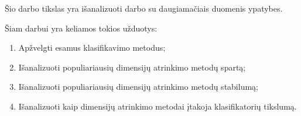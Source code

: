 Šio darbo tikslas yra išanalizuoti darbo su daugiamačiais duomenis ypatybes.

Šiam darbui yra keliamos tokios užduotys:
\begin{enumerate}
 \item Apžvelgti esamus klasifikavimo metodus;
 \item Išanalizuoti populiariausių dimensijų atrinkimo metodų spartą;
 \item Išanalizuoti populiariausių dimensijų atrinkimo metodų stabilumą;
 \item Išanalizuoti kaip dimensijų atrinkimo metodai įtakoja klasifikatorių tikslumą.
\end{enumerate}



